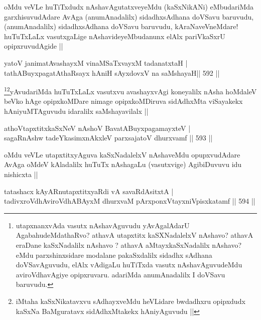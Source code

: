 \begin{artha}
oMdu veVLe huTiTxdudx nAshavAgutatxveyeMdu (kaSxNikANi) eMbudariMda garxhisuvudAdare AvAga (anumAnadalilx) sidadhxsAdhana doVSavu baruvudu, (anumAnadalilx) sidadhxsAdhana doVSavu baruvudu, kAraNaveVneMdare! huTuTxLaLx vasutxgaLige nAshavideyeMbudanunx elAlx pariVkaSxrU opipxruvudAgide ||
\end{artha}


\begin{shl}
yatoV janimatA\s vashayxM vinaMSaTxvayxM tadanatxtaH | \\
tathA\s BuyxpagatAthaRsayx hAniH sAyxdovxV na saMshayaH\hfill ||  592 ||  
\end{shl}

\begin{artha}
\footnote{utapxnanxvAda vasutx nAshavAguvudu yAvAgalAdarU AgabahudeMdathaRvo? athavA utapxtitx kaSXNadalelxV nAshavo? athavA eraDane kaSxNadalilx nAshavo
? athavA aMtayxkaSxNadalilx nAshavo? eMdu parxshinxsidare modalane pakaSxdalilx sidadhx sAdhana doVSavAguvudu, elAlx vAdigaLu huTiTxda vasutx nAshavAguvudeMdu aviroVdhavAgiye opipxruvaru. adariMda anumAnadalilx I doVSavu baruvudu.}\footnote{iMtaha kaSxNikatavxvu sAdhayxveMdu heVLidare bwdadhxru opipxdudx kaSxNa BaMguratavx sidAdhxMtakekx hAniyAguvudu ||}yAvudariMda huTuTxLaLx vasutxvu avashayxvAgi koneyalilx nAsha hoMdaleV beVko hAge opipxkoMDare nimage opipxkoMDiruva sidAdhxMta viSayakekx hAniyuMTAguvudu idaralilx saMshayavilalx ||  
\end{artha}

\begin{shl}
athoVtapxtitxkaSxNeV nAshoV BavatA\s BuyxpagamayxteV | \\
sagaRnAshw tadeYkasimxnAkxleV parxsajatoV dhurxvamf \hfill||  593 ||  
\end{shl}

\begin{artha}
oMdu veVLe utapxtitxyAguva kaSxNadalelxV nAshaveMdu opupxvudAdare AvAga oMdeV kAladalilx huTuTx nAshagaLu (vasutxvige) AgibiDuvuvu idu nishicxta ||
\end{artha}


\begin{shl}
tatashacx kAyARnutapxtitxyaRdi vA savaRdA\s sitxtA | \\
tadivxroVdhAviroVdhABAyxM dhurxvaM pArxponxVtayxniVpisxkatamf \hfill||  594 ||  
\end{shl}

